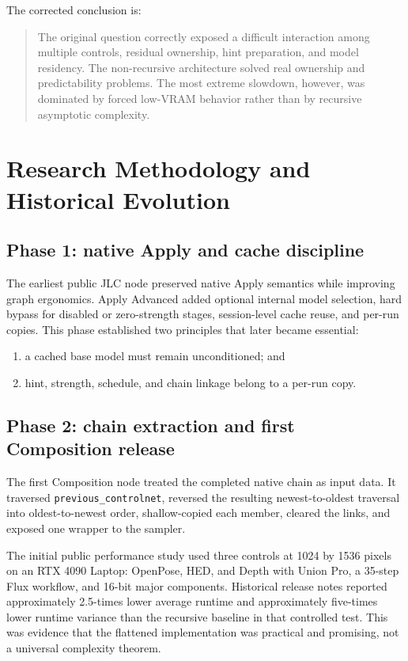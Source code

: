 \documentclass[11pt]{article}
\newcommand{\JLC}{\textsc{JLC}}
\newcommand{\code}[1]{\texttt{#1}}
\begin{document}
The corrected conclusion is:

\begin{quote}
The original question correctly exposed a difficult interaction among multiple controls, residual ownership, hint preparation, and model residency. The non-recursive architecture solved real ownership and predictability problems. The most extreme slowdown, however, was dominated by forced low-VRAM behavior rather than by recursive asymptotic complexity.
\end{quote}

\section{Research Methodology and Historical Evolution}

\subsection{Phase 1: native Apply and cache discipline}

The earliest public \JLC{} node preserved native Apply semantics while improving graph ergonomics. Apply Advanced added optional internal model selection, hard bypass for disabled or zero-strength stages, session-level cache reuse, and per-run copies. This phase established two principles that later became essential:

\begin{enumerate}
  \item a cached base model must remain unconditioned; and
  \item hint, strength, schedule, and chain linkage belong to a per-run copy.
\end{enumerate}

\subsection{Phase 2: chain extraction and first Composition release}

The first Composition node treated the completed native chain as input data. It traversed \code{previous\_controlnet}, reversed the resulting newest-to-oldest traversal into oldest-to-newest order, shallow-copied each member, cleared the links, and exposed one wrapper to the sampler.

The initial public performance study used three controls at 1024 by 1536 pixels on an RTX 4090 Laptop: OpenPose, HED, and Depth with Union Pro, a 35-step Flux workflow, and 16-bit major components. Historical release notes reported approximately 2.5-times lower average runtime and approximately five-times lower runtime variance than the recursive baseline in that controlled test. This was evidence that the flattened implementation was practical and promising, not a universal complexity theorem.
\end{document}
